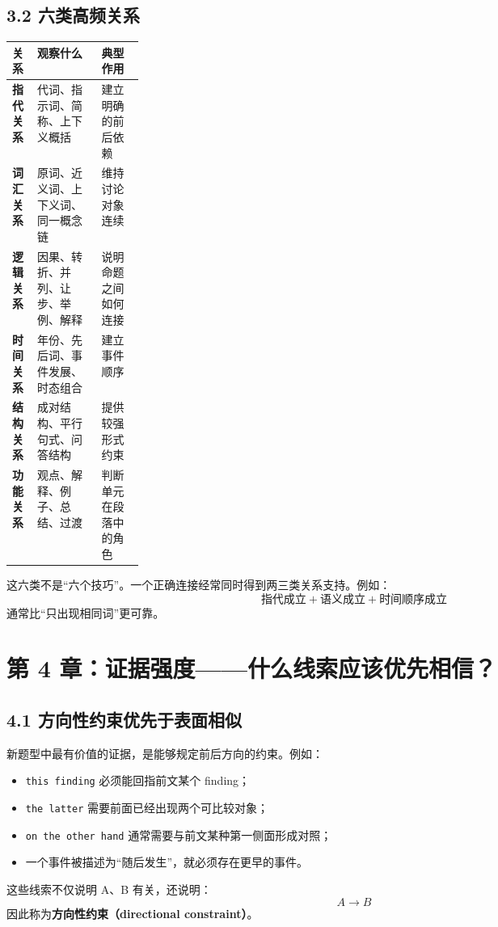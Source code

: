 \documentclass[11pt,a4paper]{ctexart}
\newcommand{\term}[2]{\textbf{#1（#2）}}
\begin{document}
\subsection{3.2 六类高频关系}
\begin{center}
\small
\begin{tabularx}{\linewidth}{>{\bfseries}p{0.19\linewidth} X X}
\toprule
关系 & 观察什么 & 典型作用 \\
\midrule
指代关系 & 代词、指示词、简称、上下义概括 & 建立明确的前后依赖 \\
词汇关系 & 原词、近义词、上下义词、同一概念链 & 维持讨论对象连续 \\
逻辑关系 & 因果、转折、并列、让步、举例、解释 & 说明命题之间如何连接 \\
时间关系 & 年份、先后词、事件发展、时态组合 & 建立事件顺序 \\
结构关系 & 成对结构、平行句式、问答结构 & 提供较强形式约束 \\
功能关系 & 观点、解释、例子、总结、过渡 & 判断单元在段落中的角色 \\
\bottomrule
\end{tabularx}
\end{center}

这六类不是“六个技巧”。一个正确连接经常同时得到两三类关系支持。例如：
\[
\text{指代成立}+\text{语义成立}+\text{时间顺序成立}
\]
通常比“只出现相同词”更可靠。

\section{第 4 章：证据强度——什么线索应该优先相信？}

\subsection{4.1 方向性约束优先于表面相似}
新题型中最有价值的证据，是能够规定前后方向的约束。例如：
\begin{itemize}
  \item \texttt{this finding} 必须能回指前文某个 finding；
  \item \texttt{the latter} 需要前面已经出现两个可比较对象；
  \item \texttt{on the other hand} 通常需要与前文某种第一侧面形成对照；
  \item 一个事件被描述为“随后发生”，就必须存在更早的事件。
\end{itemize}
这些线索不仅说明 A、B 有关，还说明：
\[
\boxed{A\rightarrow B}
\]
因此称为\term{方向性约束}{directional constraint}。
\end{document}
